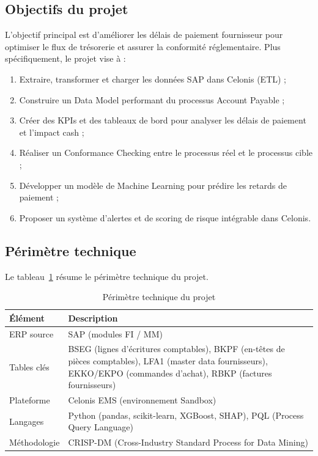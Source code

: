 \subsection{Objectifs du projet}

L'objectif principal est d'améliorer les délais de paiement fournisseur pour optimiser le flux de trésorerie et assurer la conformité réglementaire. Plus spécifiquement, le projet vise à :

\begin{enumerate}
    \item Extraire, transformer et charger les données SAP dans Celonis (ETL) ;
    \item Construire un Data Model performant du processus Account Payable ;
    \item Créer des KPIs et des tableaux de bord pour analyser les délais de paiement et l'impact cash ;
    \item Réaliser un Conformance Checking entre le processus réel et le processus cible ;
    \item Développer un modèle de Machine Learning pour prédire les retards de paiement ;
    \item Proposer un système d'alertes et de scoring de risque intégrable dans Celonis.
\end{enumerate}

\subsection{Périmètre technique}

Le tableau~\ref{tab:scope_technique} résume le périmètre technique du projet.

\begin{table}[htbp]
    \centering
    \begin{tabular}{|l|p{10cm}|}
        \hline
        \textbf{Élément} & \textbf{Description} \\
        \hline
        ERP source & SAP (modules FI / MM) \\
        \hline
        Tables clés & BSEG (lignes d'écritures comptables), BKPF (en-têtes de pièces comptables), LFA1 (master data fournisseurs), EKKO/EKPO (commandes d'achat), RBKP (factures fournisseurs) \\
        \hline
        Plateforme & Celonis EMS (environnement Sandbox) \\
        \hline
        Langages & Python (pandas, scikit-learn, XGBoost, SHAP), PQL (Process Query Language) \\
        \hline
        Méthodologie & CRISP-DM (Cross-Industry Standard Process for Data Mining) \\
        \hline
    \end{tabular}
    \caption{Périmètre technique du projet}
    \label{tab:scope_technique}
\end{table}

